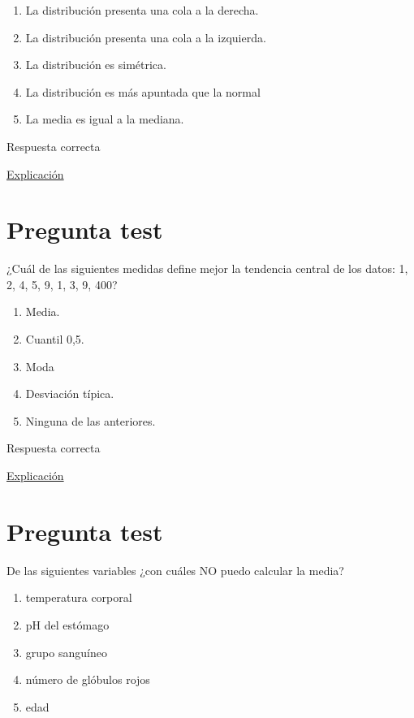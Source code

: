 \documentclass[
]{book}
\providecommand{\tightlist}{%
  \setlength{\itemsep}{0pt}\setlength{\parskip}{0pt}}
\begin{document}
\begin{enumerate}
\def\labelenumi{\alph{enumi})}
\tightlist
\item
  La distribución presenta una cola a la derecha.
\item
  La distribución presenta una cola a la izquierda.
\item
  La distribución es simétrica.
\item
  La distribución es más apuntada que la normal
\item
  La media es igual a la mediana.
\end{enumerate}

Respuesta correcta

\href{https://1fjmanzano.github.io/bioestadistica/medidas-de-forma.html}{Explicación}

\hypertarget{pregunta-test-74}{%
\section{Pregunta test}\label{pregunta-test-74}}

¿Cuál de las siguientes medidas define mejor la tendencia central de los datos: 1, 2, 4, 5, 9, 1, 3, 9, 400?

\begin{enumerate}
\def\labelenumi{\alph{enumi})}
\tightlist
\item
  Media.
\item
  Cuantil 0,5.
\item
  Moda
\item
  Desviación típica.
\item
  Ninguna de las anteriores.
\end{enumerate}

Respuesta correcta

\href{https://1fjmanzano.github.io/bioestadistica/medidas-de-posicio\%CC\%81n-dispersio\%CC\%81n-y-forma.html\#medidas-de-posicio\%CC\%81n-no-centrales}{Explicación}

\hypertarget{pregunta-test-75}{%
\section{Pregunta test}\label{pregunta-test-75}}

De las siguientes variables ¿con cuáles NO puedo calcular la media?

\begin{enumerate}
\def\labelenumi{\alph{enumi})}
\tightlist
\item
  temperatura corporal
\item
  pH del estómago
\item
  grupo sanguíneo
\item
  número de glóbulos rojos
\item
  edad
\end{enumerate}
\end{document}
